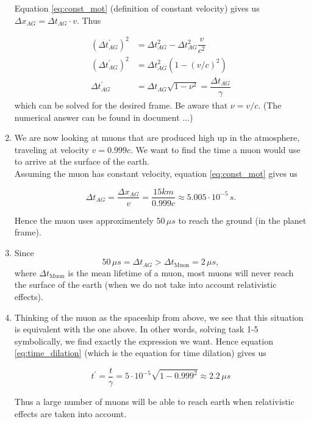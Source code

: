 \documentclass[a4paper,10pt,english]{article}
\begin{document}
\begin{enumerate}
Equation \ref{eq:const_mot} (definition of constant velocity) gives us $\Delta x_{AG}=\Delta t_{AG}\cdot v$. Thus

\begin{align}
(\Delta t_{AG}^{\prime})^2&=\Delta t_{AG}^2-\Delta t_{AG}^2\dfrac{v}{c^2} \nonumber\\
(\Delta t_{AG}^{\prime})^2&=\Delta t_{AG}^2\left(1-(v/c)^2\right) \nonumber\\
\Delta t_{AG}^{\prime}&=\Delta t_{AG}\sqrt{1-\nu^2}=\dfrac{\Delta t_{AG}}{\gamma}\label{eq:time_dilation}
\end{align}
which can be solved for the desired frame. Be aware that $\nu=v/c$. (The numerical answer can be found in document $\ldots$)

\item We are now looking at muons that are produced high up in the atmosphere, traveling at velocity $v=0.999c$. We want to find the time a muon would use to arrive at the surface of the earth.\\
Assuming the muon has constant velocity, equation \ref{eq:const_mot} gives us

\begin{equation*}
\Delta t_{AG}=\dfrac{\Delta x_{AG}}{v}=\dfrac{15km}{0.999c}\approx5.005\cdot 10^{-5}\,s.
\end{equation*}

Hence the muon uses approximentely $50\,\mu s$ to reach the ground (in the planet frame).


\item Since \[50\,\mu s=\Delta t_{AG}>\Delta t_{\text{Muon}}=2\,\mu s,\] where $\Delta t_{\text{Muon}}$ is the mean lifetime of a muon, most muons will never reach the surface of the earth (when we do not take into account relativistic effects).

\item Thinking of the muon as the spaceship from above, we see that this situation is equivalent with the one above. In other words, solving task 1-5 symbolically, we find exactly the expression we want. Hence equation \ref{eq:time_dilation} (which is the equation for time dilation) gives us

\begin{equation*}
t^{\prime}=\dfrac{t}{\gamma}=5\cdot 10^{-5}\sqrt{1-0.999^{2}}\approx2.2\,\mu s
\end{equation*}

Thus a large number of muons will be able to reach earth when relativistic effects are taken into account.

\end{enumerate}
\end{document}
